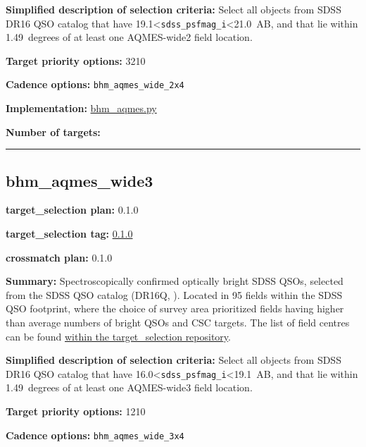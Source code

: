 \noindent\textbf{Simplified description of selection criteria:} Select all
objects from SDSS DR16 QSO catalog that have
19.1\textless{}\texttt{sdss\_psfmag\_i}\textless21.0~AB, and that lie
within 1.49~degrees of at least one AQMES-wide2 field location.


\noindent\textbf{Target priority options:} 3210

\noindent\textbf{Cadence options:} \texttt{bhm\_aqmes\_wide\_2x4}

\noindent\textbf{Implementation:}
\href{https://github.com/sdss/target_selection/blob/0.1.0/python/target_selection/cartons/bhm_aqmes.py}{bhm\_aqmes.py}

\noindent\textbf{Number of targets:}

\begin{center}\rule{0.5\linewidth}{0.5pt}\end{center}

\hypertarget{bhm_aqmes_wide3_plan0.1.0}{%
\subsection{bhm\_aqmes\_wide3}\label{bhm_aqmes_wide3_plan0.1.0}}

\noindent\textbf{target\_selection plan:} 0.1.0

\noindent\textbf{target\_selection tag:}
\href{https://github.com/sdss/target_selection/tree/0.1.0/}{0.1.0}

\noindent\textbf{crossmatch plan:} 0.1.0

\noindent\textbf{Summary:} Spectroscopically confirmed optically bright SDSS
QSOs, selected from the SDSS QSO catalog (DR16Q,
\citealt{Lyke2020}). Located in 95 fields within the SDSS QSO footprint,
where the choice of survey area prioritized fields having higher than
average numbers of bright QSOs and CSC targets. The list of field
centres can be found
\href{https://github.com/sdss/target_selection/blob/0.1.0/python/target_selection/masks/candidate_target_fields_bhm_aqmes_wide_v0.2.1.fits}{within
the target\_selection repository}.

\noindent\textbf{Simplified description of selection criteria:} Select all
objects from SDSS DR16 QSO catalog that have
16.0\textless{}\texttt{sdss\_psfmag\_i}\textless19.1~AB, and that lie
within 1.49~degrees of at least one AQMES-wide3 field location.


\noindent\textbf{Target priority options:} 1210

\noindent\textbf{Cadence options:} \texttt{bhm\_aqmes\_wide\_3x4}

